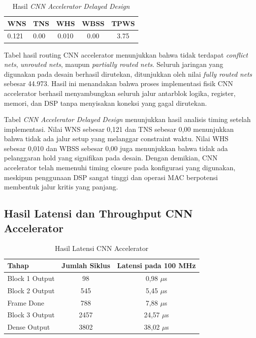 	\begin{table}[htbp]
	\centering
		\caption{Hasil \emph{CNN Accelerator Delayed Design}}
		\vspace{2mm}
		\small
		\begin{tabular}{llccc}
			\toprule
			\textbf{WNS} 	&
			\textbf{TNS} &
			\textbf{WHS} &
			\textbf{WBSS} &
			\textbf{TPWS} \\
			\midrule
			0.121 &
			0.00 &
			0.010 &
			0.00 &
			3.75 \\
			\bottomrule
		\end{tabular}
	\end{table}

Tabel hasil routing CNN accelerator menunjukkan bahwa tidak terdapat \emph{conflict nets}, \emph{unrouted nets}, maupun \emph{partially routed nets}. Seluruh jaringan yang digunakan pada desain berhasil dirutekan, ditunjukkan oleh nilai \emph{fully routed nets} sebesar 44.973. Hasil ini menandakan bahwa proses implementasi fisik CNN accelerator berhasil menyambungkan seluruh jalur antarblok logika, register, memori, dan DSP tanpa menyisakan koneksi yang gagal dirutekan.

Tabel \emph{CNN Accelerator Delayed Design} menunjukkan hasil analisis timing setelah implementasi. Nilai WNS sebesar 0,121 dan TNS sebesar 0,00 menunjukkan bahwa tidak ada jalur setup yang melanggar constraint waktu. Nilai WHS sebesar 0,010 dan WBSS sebesar 0,00 juga menunjukkan bahwa tidak ada pelanggaran hold yang signifikan pada desain. Dengan demikian, CNN accelerator telah memenuhi timing closure pada konfigurasi yang digunakan, meskipun penggunaan DSP sangat tinggi dan operasi MAC berpotensi membentuk jalur kritis yang panjang.

    \subsection{Hasil Latensi dan Throughput CNN Accelerator}

	\begin{table}[H]
		\centering
		\caption{Hasil Latensi CNN Accelerator}
		\label{tab:latency-cnn}
		\begin{tabular}{|l|c|c|}
			\hline
			\textbf{Tahap} & \textbf{Jumlah Siklus} & \textbf{Latensi pada 100 MHz} \\ \hline
			Block 1 Output & 98 & 0,98 $\mu$s \\ \hline
			Block 2 Output & 545 & 5,45 $\mu$s \\ \hline
			Frame Done & 788 & 7,88 $\mu$s \\ \hline
			Block 3 Output & 2457 & 24,57 $\mu$s \\ \hline
			Dense Output & 3802 & 38,02 $\mu$s \\ \hline
		\end{tabular}
	\end{table}

